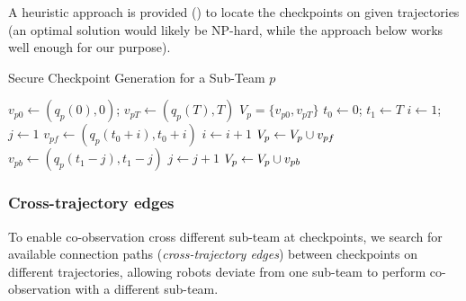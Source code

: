 \documentclass[10pt,twocolumn,twoside]{IEEEtran}
\begin{document}
A heuristic approach is provided () to locate the checkpoints on given trajectories (an optimal solution would likely be NP-hard, while the approach below works well enough for our purpose). %


\begin{algorithm}
  \caption{Secure Checkpoint Generation for a Sub-Team $p$}\label{alg:checkpoint-gen}
  \begin{algorithmic}
  \State $v_{p0} \gets (q_{p}(0),0)$; $v_{pT} \gets (q_{p}(T),T)$
  \State $V_{p} = \{v_{p0}, v_{pT}\}$
  \State $t_0 \gets 0$; $t_1 \gets T$
    \State $i \gets 1$; $j\gets 1$
      \State $v_{pf} \gets (q_{p}(t_0+i),t_0+i)$
      \State $i \gets i+1$
    \EndWhile
    \State $V_{p}\gets V_{p}\cup v_{pf}$
    \State $v_{pb} \gets (q_{p}(t_1-j),t_1-j)$
    \State $j \gets j+1$
    \EndWhile
    \State $V_{p}\gets V_{p}\cup v_{pb}$
    \EndIf
  \EndWhile
  \end{algorithmic}
  \end{algorithm}


\subsubsection{Cross-trajectory edges}\label{sec:cross-traj-edges}
To enable co-observation cross different sub-team at checkpoints, we search for available connection paths (\emph{cross-trajectory edges}) between checkpoints on different trajectories, allowing robots deviate from one sub-team to perform co-observation with a different sub-team. 
\end{document}
